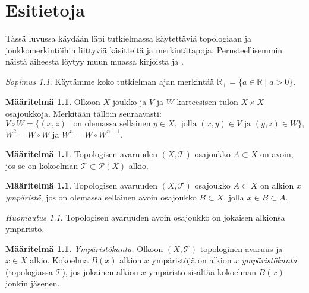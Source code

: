 \documentclass[12pt,a4paper,leqno]{report}
\newcommand{\R}{\mathbb{R}}
\newcommand{\T}{\mathcal{T}}
\newcommand{\Pot}{\mathcal{P}}
\theoremstyle{plain}
\theoremstyle{definition}
\newtheorem{maar}[equation]{Määritelmä}
\theoremstyle{remark}
\newtheorem{huom}[equation]{Huomautus}
\newtheorem{sopimus}[equation]{Sopimus}
\begin{document}
\chapter{Esitietoja}
Tässä luvussa käydään läpi tutkielmassa käytettäviä topologiaan ja joukkomerkintöihin liittyviä käsitteitä ja merkintätapoja. 
Perusteellisemmin näistä aiheesta löytyy muun muassa kirjoista 
\cite{Eom1} ja \cite{Topo2}.
\begin{sopimus}
Käytämme koko tutkielman ajan merkintää $\R_+=\{a\in\R\mid a>0\}$.
\end{sopimus}
\begin{maar}
Olkoon $X$ joukko ja $V$ ja $W$ karteesisen tulon $X\times X$ osajoukkoja.
Merkitään tällöin %
seuraavasti: 
$$V\circ W=\{(x,z)\mid \text{on olemassa sellainen }y \in X,\text{ jolla }(x,y)\in V\text{ ja }(y,z)\in W\},$$ 
$W^2=W\circ W$ ja $W^n=W\circ W^{n-1}$.
\end{maar}
\begin{maar}
Topologisen avaruuden $(X,\T)$ osajoukko $A\subset X$ on avoin, 
jos se on kokoelman $\T\subset\Pot(X)$ alkio.
\end{maar}
\begin{maar}%
Topologisen avaruuden $(X,\T)$ 
osa\-jouk\-ko $A\subset X$ on alkion $x$ \emph{ympäristö}, 
jos on olemassa sellainen avoin osajoukko $B\subset X $, jolla $x\in B\subset A$.
\end{maar}
\begin{huom}
Topologisen avaruuden avoin osajoukko on 
jokaisen alkionsa ympäristö.
\end{huom}
\begin{maar}%
\emph{Ympäristökanta.} 
Olkoon $(X,\T)$ topologinen avaruus ja $x\in X$ alkio. 
Kokoelma $B(x)$ alkion $x$ ympäristöjä on alkion $x$ \emph{ympäristökanta} 
(topologiassa $\T$), jos jokainen alkion $x$ ympäristö sisältää 
kokoelman $B(x)$ jonkin jäsenen. 
\end{maar}
\end{document}
